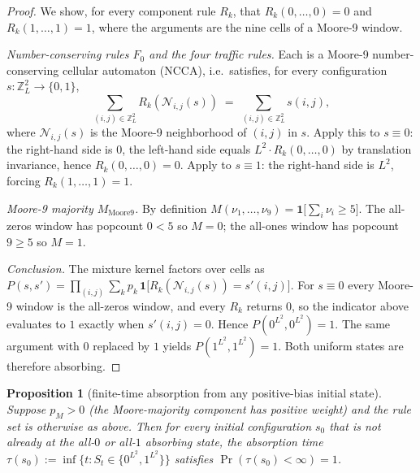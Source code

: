 \documentclass[11pt,a4paper]{article}
\newtheorem{proposition}{Proposition}
\begin{document}
\begin{proof}
We show, for every component rule \(R_k\), that
\(R_k(0,\ldots,0) = 0\) and \(R_k(1,\ldots,1) = 1\), where the
arguments are the nine cells of a Moore-9 window.

\emph{Number-conserving rules \(F_0\) and the four traffic rules.}
Each is a Moore-9 number-conserving cellular automaton (NCCA), i.e.\
satisfies, for every configuration \(s : \mathbb{Z}^2_L \to \{0,1\}\),
\[
\sum_{(i,j) \in \mathbb{Z}^2_L} R_k(\mathcal{N}_{i,j}(s))
\;=\;
\sum_{(i,j) \in \mathbb{Z}^2_L} s(i,j),
\]
where \(\mathcal{N}_{i,j}(s)\) is the Moore-9 neighborhood of \((i,j)\)
in \(s\).  Apply this to \(s \equiv 0\): the right-hand side is \(0\),
the left-hand side equals \(L^2 \cdot R_k(0,\ldots,0)\) by translation
invariance, hence \(R_k(0,\ldots,0) = 0\).  Apply to \(s \equiv 1\):
the right-hand side is \(L^2\), forcing \(R_k(1,\ldots,1) = 1\).

\emph{Moore-9 majority \(M_{\mathrm{Moore9}}\).}  By definition
\(M(\nu_1,\ldots,\nu_9) = \mathbf{1}\bigl[\sum_i \nu_i \geq 5\bigr]\).
The all-zeros window has popcount \(0 < 5\) so \(M = 0\); the all-ones
window has popcount \(9 \geq 5\) so \(M = 1\).

\emph{Conclusion.}  The mixture kernel factors over cells as
\(P(s, s') = \prod_{(i,j)} \sum_k p_k\,
\mathbf{1}\bigl[R_k(\mathcal{N}_{i,j}(s)) = s'(i,j)\bigr]\).
For \(s \equiv 0\) every Moore-9 window is the all-zeros window, and
every \(R_k\) returns \(0\), so the indicator above evaluates to \(1\)
exactly when \(s'(i,j) = 0\).  Hence \(P(0^{L^2}, 0^{L^2}) = 1\).
The same argument with \(0\) replaced by \(1\) yields
\(P(1^{L^2}, 1^{L^2}) = 1\).  Both uniform states are therefore
absorbing.
\end{proof}

\begin{proposition}[finite-time absorption from any positive-bias initial state]
\label{prop:absorb-finite}
Suppose \(p_M > 0\) (the Moore-majority component has positive weight)
and the rule set is otherwise as above.  Then for every initial
configuration \(s_0\) that is not already at the all-\(0\) or all-\(1\)
absorbing state, the absorption time \(\tau(s_0) := \inf\{t : S_t \in
\{0^{L^2}, 1^{L^2}\}\}\) satisfies \(\Pr(\tau(s_0) < \infty) = 1\).
\end{proposition}
\end{document}

